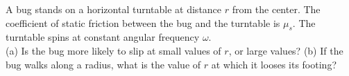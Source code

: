 A bug stands on a horizontal turntable at distance $r$ from the center.
The coefficient of static friction between the bug and the turntable
is $\mu_s$. The turntable spins at constant angular frequency $\omega$.\\
%
(a) Is the bug more likely to slip at small values of $r$, or large values?\hwendpart
%
(b) If the bug walks along a radius,
what is the value of $r$ at which it looses its footing?\answercheck
